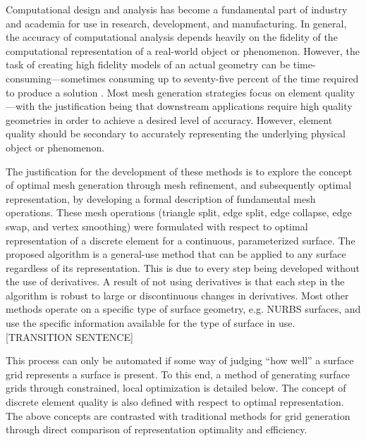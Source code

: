 Computational design and analysis has become a fundamental part of
industry and academia for use in research, development, and
manufacturing. In general, the accuracy of computational analysis
depends heavily on the fidelity of the computational representation of a
real-world object or phenomenon. However, the task of creating high
fidelity models of an actual geometry can be time-consuming---sometimes
consuming up to seventy-five percent of the time required to produce a
solution \cite{bischoff05}. Most mesh generation strategies focus on
element quality---with the justification being that downstream
applications require high quality geometries in order to achieve a
desired level of accuracy. However, element quality should be secondary
to accurately representing the underlying physical object or phenomenon.

The justification for the development of these methods is to explore
the concept of optimal mesh generation through mesh refinement, and
subsequently optimal representation, by developing a formal description
of fundamental mesh operations. These mesh operations (triangle split,
edge split, edge collapse, edge swap, and vertex smoothing) were
formulated with respect to optimal representation of a discrete element
for a continuous, parameterized surface. The proposed algorithm is a
general-use method that can be applied to any surface regardless of its
representation. This is due to every step being developed without the
use of derivatives. A result of not using derivatives is that each step
in the algorithm is robust to large or discontinuous changes in
derivatives. Most other methods operate on a specific type of surface
geometry, e.g. NURBS surfaces, and use the specific information
available for the type of surface in use.
[TRANSITION SENTENCE] 

This process can only be automated if some way of judging ``how well'' a
surface grid represents a surface is present. To this end, a method of
generating surface grids through constrained, local optimization is
detailed below. The concept of discrete element quality is also defined
with respect to optimal representation. The above concepts are
contrasted with traditional methods for grid generation through direct
comparison of representation optimality and efficiency.
